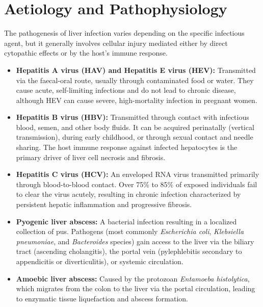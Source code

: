 \section*{Aetiology and Pathophysiology}
The pathogenesis of liver infection varies depending on the specific infectious agent, but it generally involves cellular injury mediated either by direct cytopathic effects or by the host's immune response.
\begin{itemize}
    \item \textbf{Hepatitis A virus (HAV) and Hepatitis E virus (HEV):} Transmitted via the faecal-oral route, usually through contaminated food or water. They cause acute, self-limiting infections and do not lead to chronic disease, although HEV can cause severe, high-mortality infection in pregnant women.
    \item \textbf{Hepatitis B virus (HBV):} Transmitted through contact with infectious blood, semen, and other body fluids. It can be acquired perinatally (vertical transmission), during early childhood, or through sexual contact and needle sharing. The host immune response against infected hepatocytes is the primary driver of liver cell necrosis and fibrosis.
    \item \textbf{Hepatitis C virus (HCV):} An enveloped RNA virus transmitted primarily through blood-to-blood contact. Over 75\% to 85\% of exposed individuals fail to clear the virus acutely, resulting in chronic infection characterized by persistent hepatic inflammation and progressive fibrosis.
    \item \textbf{Pyogenic liver abscess:} A bacterial infection resulting in a localized collection of pus. Pathogens (most commonly \textit{Escherichia coli}, \textit{Klebsiella pneumoniae}, and \textit{Bacteroides} species) gain access to the liver via the biliary tract (ascending cholangitis), the portal vein (pylephlebitis secondary to appendicitis or diverticulitis), or systemic circulation.
    \item \textbf{Amoebic liver abscess:} Caused by the protozoan \textit{Entamoeba histolytica}, which migrates from the colon to the liver via the portal circulation, leading to enzymatic tissue liquefaction and abscess formation.
\end{itemize}

